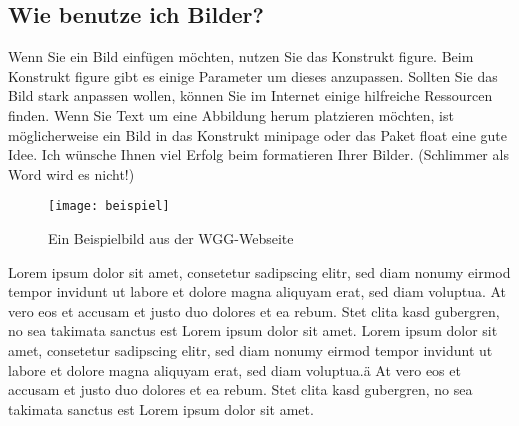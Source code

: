 \subsection{Wie benutze ich Bilder?}
Wenn Sie ein Bild einfügen möchten, nutzen Sie das Konstrukt figure. Beim Konstrukt figure gibt es einige Parameter um dieses anzupassen.
Sollten Sie das Bild stark anpassen wollen, können Sie im Internet einige hilfreiche Ressourcen finden.
Wenn Sie Text um eine Abbildung herum platzieren möchten, ist möglicherweise ein Bild in das Konstrukt minipage oder das Paket float eine gute Idee.
Ich wünsche Ihnen viel Erfolg beim formatieren Ihrer Bilder. (Schlimmer als Word wird es nicht!)\\
\begin{figure}[H]
    \texttt{[image: beispiel]}
    \caption{Ein Beispielbild aus der WGG-Webseite \autocite{wggwallpaper}}
    \label{wallpaper}
\end{figure}
Lorem ipsum dolor sit amet, consetetur sadipscing elitr, sed diam nonumy eirmod tempor invidunt ut labore et dolore magna aliquyam erat, sed diam voluptua.
At vero eos et accusam et justo duo dolores et ea rebum.
Stet clita kasd gubergren, no sea takimata sanctus est Lorem ipsum dolor sit amet.
Lorem ipsum dolor sit amet, consetetur sadipscing elitr, sed diam nonumy eirmod tempor invidunt ut labore et dolore magna aliquyam erat, sed diam voluptua.ä
At vero eos et accusam et justo duo dolores et ea rebum. Stet clita kasd gubergren, no sea takimata sanctus est Lorem ipsum dolor sit amet.